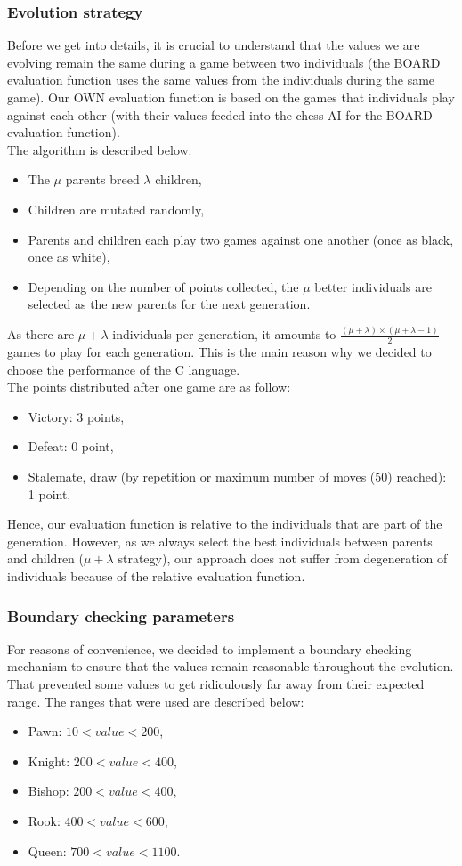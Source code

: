 \documentclass[11pt,a4paper,twocolumn]{article}
\begin{document}
\subsubsection{Evolution strategy}
Before we get into details, it is crucial to understand that the values we are evolving remain the same during a game between two individuals (the BOARD evaluation function uses the same values from the individuals during the same game). Our OWN evaluation function is based on the games that individuals play against each other (with their values feeded into the chess AI for the BOARD evaluation function).\\
The algorithm is described below:
\begin{itemize}
\item The $\mu$ parents breed $\lambda$ children,
\item Children are mutated randomly,
\item Parents and children each play two games against one another (once as black, once as white),
\item Depending on the number of points collected, the $\mu$ better individuals are selected as the new parents for the next generation.
\end{itemize}
As there are $\mu + \lambda$ individuals per generation, it amounts to $\frac{(\mu + \lambda)\times (\mu + \lambda - 1)}{2}$ games to play for each generation. This is the main reason why we decided to choose the performance of the C language.\\
The points distributed after one game are as follow:
\begin{itemize}
\item Victory: 3 points,
\item Defeat: 0 point,
\item Stalemate, draw (by repetition or maximum number of moves (50) reached): 1 point.
\end{itemize}
Hence, our evaluation function is relative to the individuals that are part of the generation. However, as we always select the best individuals between parents and children ($\mu + \lambda$ strategy), our approach does not suffer from degeneration of individuals because of the relative evaluation function.

\subsubsection{Boundary checking parameters}
For reasons of convenience, we decided to implement a boundary checking mechanism to ensure that the values remain reasonable throughout the evolution. That prevented some values to get ridiculously far away from their expected range. The ranges that were used are described below:
\begin{itemize}
\item Pawn: $10 < value < 200$,
\item Knight: $200 < value < 400$,
\item Bishop: $200 < value < 400$,
\item Rook: $400 < value < 600$,
\item Queen: $700 < value < 1100$.
\end{itemize}
\end{document}
